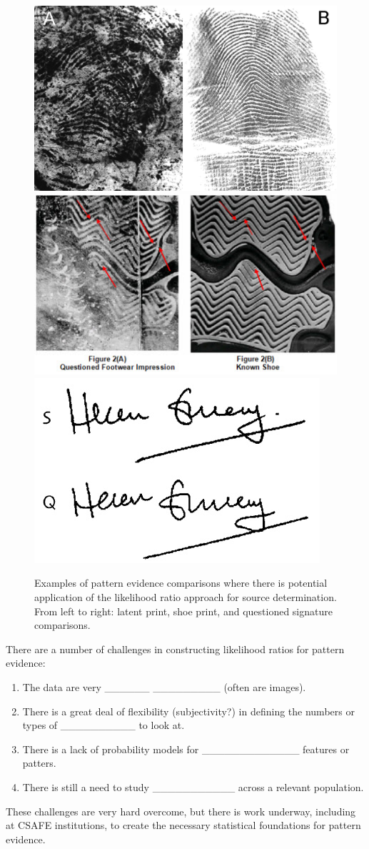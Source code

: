 \documentclass[]{book}
\providecommand{\tightlist}{%
  \setlength{\itemsep}{0pt}\setlength{\parskip}{0pt}}
\theoremstyle{definition}
\theoremstyle{definition}
\theoremstyle{remark}
\begin{document}
\begin{figure}
\includegraphics[width=0.32\linewidth]{img/mayfieldfinger} \includegraphics[width=0.32\linewidth]{img/shoecompare} \includegraphics[width=0.32\linewidth]{img/signature} \caption{Examples of pattern evidence comparisons where there is potential application of the likelihood ratio approach for source determination. From left to right: latent print, shoe print, and questioned signature comparisons.}\label{fig:trace}
\end{figure}

There are a number of challenges in constructing likelihood ratios for
pattern evidence:

\begin{enumerate}
\def\labelenumi{\arabic{enumi}.}
\tightlist
\item
  The data are very \_\_\_\_\_\_ \_\_\_\_\_\_\_\_\_ (often are images).
  \vspace{.1in}
\item
  There is a great deal of flexibility (subjectivity?) in defining the
  numbers or types of \_\_\_\_\_\_\_\_\_\_ to look at. \vspace{.1in}
\item
  There is a lack of probability models for \_\_\_\_\_\_\_\_\_\_\_\_\_
  features or patters. \vspace{.1in}
\item
  There is still a need to study \_\_\_\_\_\_\_\_\_\_\_ across a
  relevant population.
\end{enumerate}

These challenges are very hard overcome, but there is work underway,
including at CSAFE institutions, to create the necessary statistical
foundations for pattern evidence.
\end{document}
